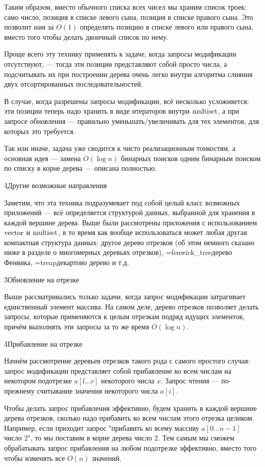 Таким образом, вместо обычного списка всех чисел мы храним список троек: само число, позиция в списке левого сына, позиция в списке правого сына. Это позволит нам за $O (1)$ определять позицию в списке левого или правого сына, вместо того чтобы делать двоичный список по нему.

Проще всего эту технику применять к задаче, когда запросы модификации отсутствуют, --- тогда эти позиции представляют собой просто числа, а подсчитывать их при построении дерева очень легко внутри алгоритма слияния двух отсортированных последовательностей.

В случае, когда разрешены запросы модификации, всё несколько усложняется: эти позиции теперь надо хранить в виде итераторов внутри $\rm multiset$, а при запросе обновления --- правильно уменьшать/увеличивать для тех элементов, для которых это требуется.

Так или иначе, задача уже сводится к чисто реализационным тонкостям, а основная идея --- замена $O (\log n)$ бинарных поисков одним бинарным поиском по списку в корне дерева --- описана полностью.

\h4{Другие возможные направления}

Заметим, что эта техника подразумевает под собой целый класс возможных приложений --- всё определяется структурой данных, выбранной для хранения в каждой вершине дерева. Выше были рассмотрены приложения с использованием $\rm vector$ и $\rm multiset$, в то время как вообще использоваться может любая другая компактная структура данных: другое дерево отрезков (об этом немного сказано ниже в разделе о многомерных деревьях отрезков), \algohref=fenwick_tree{дерево Фенвика}, \algohref=treap{декартово дерево} и т.д.


\h3{Обновление на отрезке}

Выше рассматривались только задачи, когда запрос модификации затрагивает единственный элемент массива. На самом деле, дерево отрезков позволяет делать запросы, которые применяются к целым отрезкам подряд идущих элементов, причём выполнять эти запросы за то же время $O (\log n)$.

\h4{Прибавление на отрезке}

Начнём рассмотрение деревьев отрезков такого рода с самого простого случая: запрос модификации представляет собой прибавление ко всем числам на некотором подотрезке $a[l \ldots r]$ некоторого числа $x$. Запрос чтения --- по-прежнему считывание значения некоторого числа $a[i]$.

Чтобы делать запрос прибавления эффективно, будем хранить в каждой вершине дерева отрезков, сколько надо прибавить ко всем числам этого отрезка целиком. Например, если приходит запрос "прибавить ко всему массиву $a[0 \ldots n-1]$ число 2", то мы поставим в корне дерева число $2$. Тем самым мы сможем обрабатывать запрос прибавления на любом подотрезке эффективно, вместо того чтобы изменять все $O (n)$ значений.

